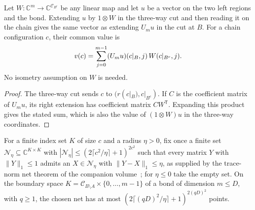 \begin{lemma}
    \label{thm:chain_gluing_left_extension}
    \leanok
    Let $W:\mathbb C^m\to\mathbb C^{\mathcal C_{B^c}}$ be any linear map
    and let $u$ be a vector on the two left regions and the bond.
    Extending $u$ by $1\otimes W$ in the three-way cut and then reading it
    on the chain gives the same vector as extending $U_m u$ in the cut at
    $B$. For a chain configuration $c$, their common value is
    \begin{align}
        v(c)=\sum_{j=0}^{m-1}(U_m u)(c|_B,j)\,W(c|_{B^c},j). \notag
    \end{align}
    No isometry assumption on $W$ is needed.
\end{lemma}
\begin{proof}
    \leanok
    The three-way cut sends $c$ to $(r(c|_B),c|_{B^c})$.
    If $C$ is the coefficient matrix of $U_m u$, its right extension has
    coefficient matrix $CW^{\mathsf T}$. Expanding this product gives
    the stated sum, which is also the value of $(1\otimes W)u$ in the
    three-way coordinates.
\end{proof}

\begin{definition}
    \label{def:chain_boundary_trace_norm_net}
    \leanok
    For a finite index set $K$ of size $c$ and a radius $\eta>0$, fix once a
    finite set $\mathcal N_\eta\subseteq\mathbb C^{K\times K}$ with
    $|\mathcal N_\eta|\le(2\lceil c^2/\eta\rceil+1)^{2c^2}$ such that every
    matrix $Y$ with $\|Y\|_1\le1$ admits an $X\in\mathcal N_\eta$ with
    $\|Y-X\|_1\le\eta$, as supplied by the trace-norm net theorem of the
    companion volume~\cite[``A trace-norm net'']{QICLean2026Blueprint}; for
    $\eta\le0$ take the empty set. On the boundary space
    $K=\mathcal C_{B\setminus A}\times\{0,\ldots,m-1\}$ of a bond of
    dimension $m\le D$, with $q\ge1$, the chosen net has at most
    $(2\lceil(qD)^2/\eta\rceil+1)^{2(qD)^2}$ points.
\end{definition}

